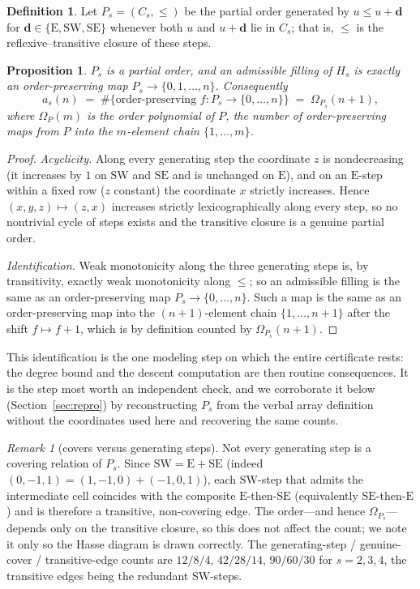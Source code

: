 \documentclass[11pt]{article}
\theoremstyle{plain}
\newtheorem{proposition}[theorem]{Proposition}
\theoremstyle{definition}
\newtheorem{definition}[theorem]{Definition}
\theoremstyle{remark}
\newtheorem{remark}[theorem]{Remark}
\newcommand{\Eseq}{\mathrm{E}}
\newcommand{\SW}{\mathrm{SW}}
\newcommand{\SE}{\mathrm{SE}}
\newcommand{\Om}{\Omega}
\begin{document}
\begin{definition}\label{def:poset}
Let $P_s=(C_s,\le)$ be the partial order generated by $u\le u+\mathbf d$ for
$\mathbf d\in\{\Eseq,\SW,\SE\}$ whenever both $u$ and $u+\mathbf d$ lie in $C_s$; that is, $\le$ is
the reflexive--transitive closure of these steps.
\end{definition}

\begin{proposition}\label{prop:order}
$P_s$ is a partial order, and an admissible filling of $H_s$ is exactly an order-preserving map
$P_s\to\{0,1,\dots,n\}$. Consequently
\[
  a_s(n)\;=\;\#\{\text{order-preserving } f:P_s\to\{0,\dots,n\}\}\;=\;\Om_{P_s}(n+1),
\]
where $\Om_P(m)$ is the order polynomial of $P$, the number of order-preserving maps from $P$ into
the $m$-element chain $\{1,\dots,m\}$.
\end{proposition}

\begin{proof}
\emph{Acyclicity.} Along every generating step the coordinate $z$ is nondecreasing (it increases by
$1$ on $\SW$ and $\SE$ and is unchanged on $\Eseq$), and on an $\Eseq$-step within a fixed row ($z$
constant) the coordinate $x$ strictly increases. Hence $(x,y,z)\mapsto(z,x)$ increases strictly
lexicographically along every step, so no nontrivial cycle of steps exists and the transitive
closure is a genuine partial order.

\emph{Identification.} Weak monotonicity along the three generating steps is, by transitivity,
exactly weak monotonicity along $\le$; so an admissible filling is the same as an order-preserving
map $P_s\to\{0,\dots,n\}$. Such a map is the same as an order-preserving map into the
$(n+1)$-element chain $\{1,\dots,n+1\}$ after the shift $f\mapsto f+1$, which is by definition
counted by $\Om_{P_s}(n+1)$.
\end{proof}

\noindent This identification is the one modeling step on which the entire certificate rests: the
degree bound and the descent computation are then routine consequences. It is the step most worth an
independent check, and we corroborate it below (Section~\ref{sec:repro}) by reconstructing $P_s$ from
the verbal array definition without the coordinates used here and recovering the same counts.

\begin{remark}[covers versus generating steps]\label{rem:covers}
Not every generating step is a covering relation of $P_s$. Since $\SW=\Eseq+\SE$ (indeed
$(0,-1,1)=(1,-1,0)+(-1,0,1)$), each $\SW$-step that admits the intermediate cell coincides with the
composite $\Eseq$-then-$\SE$ (equivalently $\SE$-then-$\Eseq$) and is therefore a transitive,
non-covering edge. The order---and hence $\Om_{P_s}$---depends only on the transitive closure, so
this does not affect the count; we note it only so the Hasse diagram is drawn correctly. The
generating-step / genuine-cover / transitive-edge counts are $12/8/4$, $42/28/14$, $90/60/30$ for
$s=2,3,4$, the transitive edges being the redundant $\SW$-steps.
\end{remark}
\end{document}
